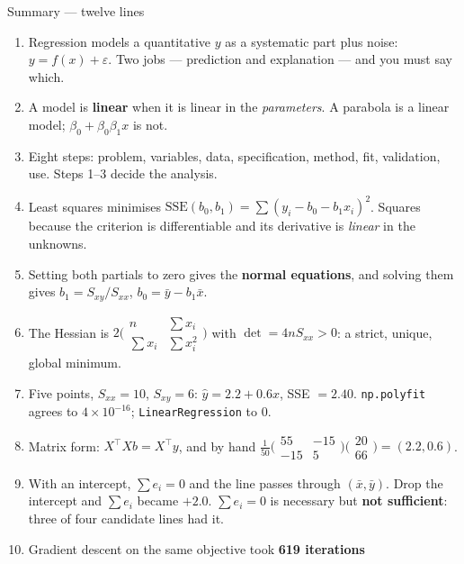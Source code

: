 \documentclass[aspectratio=169]{beamer}
\begin{document}
\begin{frame}[shrink=15]{Summary --- twelve lines}
  \begin{enumerate}\small
    \item Regression models a quantitative $y$ as a systematic part plus
      noise: $y = f(x) + \varepsilon$. Two jobs --- prediction and
      explanation --- and you must say which.
    \item A model is \textbf{linear} when it is linear in the
      \emph{parameters}. A parabola is a linear model; $\beta_0 +
      \beta_0\beta_1x$ is not.
    \item Eight steps: problem, variables, data, specification, method, fit,
      validation, use. Steps 1--3 decide the analysis.
    \item Least squares minimises $\mathrm{SSE}(b_0,b_1) = \sum(y_i - b_0 -
      b_1x_i)^2$. Squares because the criterion is differentiable and its
      derivative is \emph{linear} in the unknowns.
    \item Setting both partials to zero gives the \textbf{normal equations},
      and solving them gives
      $b_1 = S_{xy}/S_{xx}$, $b_0 = \bar y - b_1\bar x$.
    \item The Hessian is $2\bigl(\begin{smallmatrix} n & \sum x_i\\
      \sum x_i & \sum x_i^2\end{smallmatrix}\bigr)$ with
      $\det = 4nS_{xx} > 0$: a strict, unique, global minimum.
    \item Five points, $S_{xx}=10$, $S_{xy}=6$: $\hat y = 2.2 + 0.6x$,
      SSE $=2.40$. \texttt{np.polyfit} agrees to $4\times10^{-16}$;
      \texttt{LinearRegression} to $0$.
    \item Matrix form: $X^{\!\top}\!Xb = X^{\!\top}y$, and by hand
      $\frac1{50}\bigl(\begin{smallmatrix}55&-15\\-15&5\end{smallmatrix}
      \bigr)\bigl(\begin{smallmatrix}20\\66\end{smallmatrix}\bigr)
      = (2.2, 0.6)$.
    \item With an intercept, $\sum e_i = 0$ and the line passes through
      $(\bar x, \bar y)$. Drop the intercept and $\sum e_i$ became $+2.0$.
      $\sum e_i = 0$ is necessary but \textbf{not sufficient}: three of four
      candidate lines had it.
    \item Gradient descent on the same objective took \textbf{619 iterations}

\end{enumerate}
\end{frame}
\end{document}
